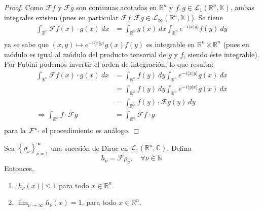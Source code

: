 \documentclass[12pt]{report}
\theoremstyle{largebreak}
\renewcommand{\leq}{\ensuremath{\leqslant}}
\newcommand\abs[1]{\ensuremath{\left|#1\right|}}
\newcommand\pint[2]{\ensuremath{\langle#1| #2\rangle}}
\newcommand{\fou}[1]{\ensuremath{\mathcal{F}#1}}
\begin{document}
    \begin{proof}
        Como $\fou{f}$ y $\fou{g}$ son continuas acotadas en $\mathbb{R}^n$ y $f,g\in\mathcal{L}_1(\mathbb{R}^n,\mathbb{K})$, ambas integrales existen (pues en particular $\fou{f},\fou{g}\in\mathcal{L}_{\infty}(\mathbb{R}^n,\mathbb{K})$). Se tiene
        \begin{equation*}
            \begin{split}
                \int_{\mathbb{R}^n}\fou{f}(x)\cdot g(x)\:dx&=\int_{\mathbb{R}^n}g(x)\:dx\int_{\mathbb{R}^n}e^{ -i\pint{x}{y}}f(y)\:dy\\
            \end{split}
        \end{equation*}
        ya se sabe que $(x,y)\mapsto e^{ -i\pint{x}{y}}g(x)f(y)$ es integrable en $\mathbb{R}^n\times\mathbb{R}^n$ (pues en módulo es igual al módulo del producto tensorial de $g$ y $f$, siendo éste integrable). Por Fubini podemos invertir el orden de integración, lo que resulta:
        \begin{equation*}
            \begin{split}
                \int_{\mathbb{R}^n}\fou{f}(x)\cdot g(x)\:dx&=\int_{\mathbb{R}^n}f(y)\:dy\int_{\mathbb{R}^n}e^{ -i\pint{x}{y}}g(x)\:dx\\
                &=\int_{\mathbb{R}^n}f(y)\:dy\int_{\mathbb{R}^n}e^{ -i\pint{y}{x}}g(x)\:dx\\
                &=\int_{\mathbb{R}^n}f(y)\cdot\fou{g}(y)\:dy\\
                \Rightarrow \int_{\mathbb{R}^n}f\cdot\fou{g}&=\int_{\mathbb{R}^n}\fou{f}\cdot g\\
            \end{split}
        \end{equation*}
        para la $\fou^*{\cdot}$ el procedimiento es análogo.
    \end{proof}

    \begin{lema}
        Sea $\left\{\rho_\nu \right\}_{\nu=1}^\infty$ una sucesión de Dirac en $\mathcal{L}_1(\mathbb{R}^n,\mathbb{C})$. Defina
        \begin{equation*}
            h_\nu=\fou{\rho_\nu},\quad\forall\nu\in\mathbb{N}
        \end{equation*}
        Entonces,
        \begin{enumerate}
            \item $\abs{h_\nu(x)}\leq1$ para todo $x\in\mathbb{R}^n$.
            \item $\lim_{\nu\rightarrow\infty}h_\nu(x)=1$, para todo $x\in\mathbb{R}^n$.
        \end{enumerate}
    \end{lema}
\end{document}
